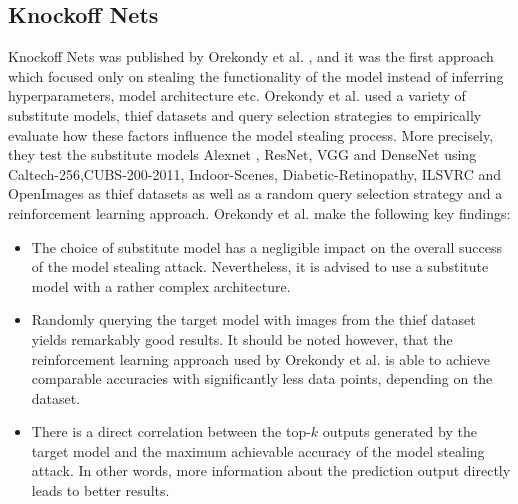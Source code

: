 \subsection{Knockoff Nets}
\label{sec:Related_work:Model_Stealing:Knockoff_Nets}
Knockoff Nets was published by Orekondy et al. \cite{orekondy2019knockoff}, and it was the first approach which focused only on stealing the functionality
of the model instead of inferring hyperparameters, model architecture etc. Orekondy et al. used a variety of substitute models, thief datasets and query
selection strategies to empirically evaluate how these factors influence the model stealing process. More precisely, they test the substitute models
Alexnet \cite{krizhevsky2017imagenet}, ResNet, VGG and DenseNet \cite{huang2017densely} using Caltech-256,CUBS-200-2011, Indoor-Scenes, Diabetic-Retinopathy,
ILSVRC and OpenImages as thief datasets as well as a random query selection strategy and a reinforcement learning approach. Orekondy et al. make the following
key findings: 
\begin{itemize}
    \item The choice of substitute model has a negligible impact on the overall success of the model stealing attack. Nevertheless, it is advised to use a
    substitute model with a rather complex architecture.
    \item Randomly querying the target model with images from the thief dataset yields remarkably good results. It should be noted however, that the reinforcement
    learning approach used by Orekondy et al. is able to achieve comparable accuracies with significantly less data points, depending on the dataset.
    \item There is a direct correlation between the top-$k$ outputs generated by the target model and the maximum achievable accuracy of the model stealing attack.
    In other words, more information about the prediction output directly leads to better results.
\end{itemize}
